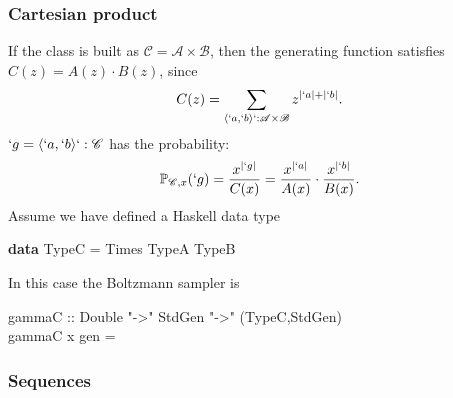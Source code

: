 \documentclass{sig-alternate}
\newcommand{\C}{\mathscr{C}}
\newcommand{\PP}{\mathbb{P}}
\begin{document}
\subsubsection*{Cartesian product}

If the class is built as $\C = \mathscr{A} \times \mathscr{B}$, then the generating
function satisfies $C(z) = A(z) \cdot B(z)$, since
\begin{displaymath}
  C(z) = \sum_{\langle`a,`b\rangle `: \mathscr{A} \times \mathscr{B}} z^{|`a|+|`b|}.
\end{displaymath}
$`g=\langle`a,`b\rangle`:\C$ has the probability:
\begin{displaymath}
  \PP_{\C,x}(`g) = \frac{x^{|`g|}}{C(x)} = \frac{x^{|`a|}}{A(x)}\cdot \frac{x^{|`b|}}{B(x)}.
\end{displaymath}
Assume we have defined a \textsf{Haskell} data type
\begin{haskell}
  \textbf{data} TypeC = Times TypeA TypeB
\end{haskell}
In this case the Boltzmann sampler is
\begin{haskell}
  \hspace*{-10pt} gammaC :: Double "->" StdGen "->" (TypeC,StdGen)\\
  \hspace*{-10pt} gammaC x gen = 
\end{haskell}

\subsubsection*{Sequences}
 
\end{document}
